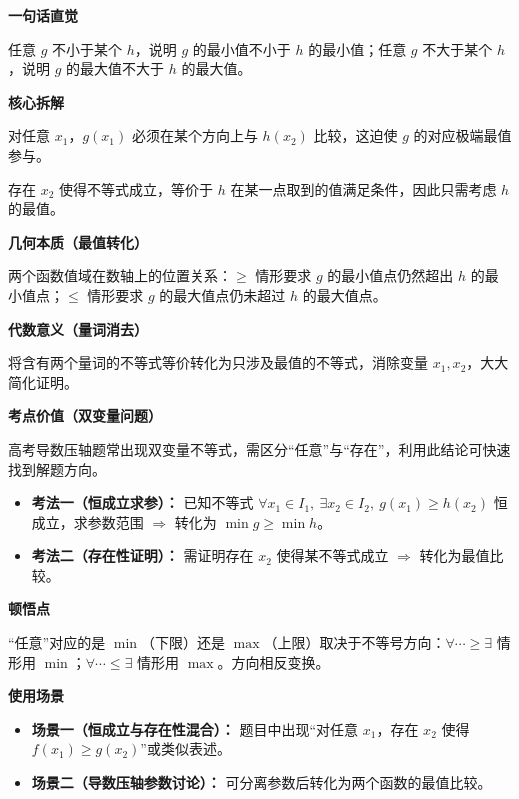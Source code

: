 \begin{explanationbox}
	\textbf{\textcolor{CExplanation}{一句话直觉}}

	任意 $g$ 不小于某个 $h$，说明 $g$ 的最小值不小于 $h$ 的最小值；任意 $g$ 不大于某个 $h$，说明 $g$ 的最大值不大于 $h$ 的最大值。

	\medskip
	\textbf{\textcolor{CExplanation}{核心拆解}}
	\begin{description}[style=nextline, leftmargin=2.8em, labelsep=0.5em, itemsep=0.45em]
		\item[\textbf{要点一（任意对应最值）：}] 对任意 $x_1$，$g(x_1)$ 必须在某个方向上与 $h(x_2)$ 比较，这迫使 $g$ 的对应极端最值参与。
		\item[\textbf{要点二（存在对应最值）：}] 存在 $x_2$ 使得不等式成立，等价于 $h$ 在某一点取到的值满足条件，因此只需考虑 $h$ 的最值。
	\end{description}

	\medskip
	\textbf{\textcolor{CExplanation}{几何本质（最值转化）}}

	两个函数值域在数轴上的位置关系：$\ge$ 情形要求 $g$ 的最小值点仍然超出 $h$ 的最小值点；$\le$ 情形要求 $g$ 的最大值点仍未超过 $h$ 的最大值点。

	\medskip
	\textbf{\textcolor{CExplanation}{代数意义（量词消去）}}

	将含有两个量词的不等式等价转化为只涉及最值的不等式，消除变量 $x_1,x_2$，大大简化证明。

	\medskip
	\textbf{\textcolor{CExplanation}{考点价值（双变量问题）}}

	高考导数压轴题常出现双变量不等式，需区分“任意”与“存在”，利用此结论可快速找到解题方向。

	\begin{itemize}[leftmargin=*, itemsep=0.5em, topsep=0.4em]
		\item \textbf{考法一（恒成立求参）：} 已知不等式 $\forall x_1\in I_1,\ \exists x_2\in I_2,\ g(x_1)\ge h(x_2)$ 恒成立，求参数范围 $\Rightarrow$ 转化为 $\min g\ge\min h$。
		\item \textbf{考法二（存在性证明）：} 需证明存在 $x_2$ 使得某不等式成立 $\Rightarrow$ 转化为最值比较。
	\end{itemize}

	\medskip
	\textbf{\textcolor{CExplanation}{顿悟点}}

	“任意”对应的是 $\min$（下限）还是 $\max$（上限）取决于不等号方向：$\forall\cdots\ge\exists$ 情形用 $\min$；$\forall\cdots\le\exists$ 情形用 $\max$。方向相反变换。

	\medskip
	\textbf{\textcolor{CExplanation}{使用场景}}
	\begin{itemize}[leftmargin=*, itemsep=0.5em, topsep=0.4em]
		\item \textbf{场景一（恒成立与存在性混合）：} 题目中出现“对任意 $x_1$，存在 $x_2$ 使得 $f(x_1)\ge g(x_2)$”或类似表述。
		\item \textbf{场景二（导数压轴参数讨论）：} 可分离参数后转化为两个函数的最值比较。
	\end{itemize}
\end{explanationbox}
